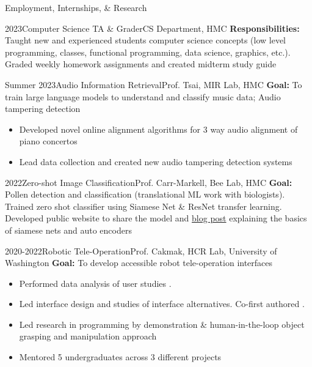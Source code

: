 \documentclass[]{mcdowellcv}
\begin{document}
\begin{cvsection}{Employment, Internships, \& Research}
	\begin{cvsubsection}{2023}{Computer Science TA \& Grader}{CS Department, HMC}
		\vspace{0.2em}
		\textbf{Responsibilities:} Taught new and experienced students computer science concepts (low level programming, classes, functional programming, data science, graphics, etc.). Graded weekly homework assignments and created midterm study guide
	\end{cvsubsection}

	\begin{cvsubsection}{Summer 2023}{Audio Information Retrieval}{Prof. Tsai, MIR Lab, HMC}
		\textbf{Goal:} To train large language models to understand and classify music data; Audio tampering detection
		\begin{itemize}
			\item Developed novel online alignment algorithms for 3 way audio alignment of piano concertos
			\item Lead data collection and created new audio tampering detection systems
		\end{itemize}
	\end{cvsubsection}

	\begin{cvsubsection}{2022}{Zero-shot Image Classification}{Prof. Carr-Markell, Bee Lab, HMC}
		\textbf{Goal:} Pollen detection and classification (translational ML work with biologists). Trained zero shot classifier using Siamese Net \& ResNet transfer learning. Developed public website to share the model and \href{https://hmcbee.blogspot.com/2022/12/blue-bees-twin-neural-networks-and-more.html}{blog post} explaining the basics of siamese nets and auto encoders
	\end{cvsubsection}

	\begin{cvsubsection}{2020-2022}{Robotic Tele-Operation}{Prof. Cakmak, HCR Lab, University of Washington}
		\textbf{Goal:} To develop accessible robot tele-operation interfaces
		\begin{itemize}
			\item Performed data analysis of user studies .
			\item Led interface design and studies of interface alternatives. Co-first authored  .
			\item Led research in programming by demonstration \& human-in-the-loop object grasping and manipulation approach
			\item Mentored 5 undergraduates across 3 different projects
		\end{itemize}
	\end{cvsubsection}


\end{cvsection}
\end{document}
